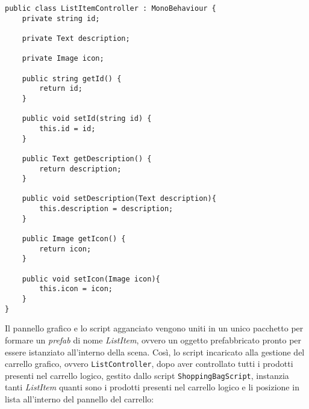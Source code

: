 \begin{lstlisting}[style=MyCStyle]
public class ListItemController : MonoBehaviour {
	private string id;

	private Text description;

	private Image icon;

	public string getId() {
		return id;
	}

	public void setId(string id) {
		this.id = id;
	}
	
	public Text getDescription() {
		return description;
	}
	
	public void setDescription(Text description){
		this.description = description;
	}
	
	public Image getIcon() {
		return icon;
	}
		
	public void setIcon(Image icon){
		this.icon = icon;
	}
}
\end{lstlisting}

Il pannello grafico e lo script agganciato vengono uniti in un unico pacchetto per formare un \textit{prefab} di nome \textit{ListItem}, ovvero un oggetto prefabbricato pronto per essere istanziato all'interno della scena. Così, lo script incaricato alla gestione del carrello grafico, ovvero \texttt{ListController}, dopo aver controllato tutti i prodotti presenti nel carrello logico, gestito dallo script \texttt{ShoppingBagScript}, instanzia tanti \textit{ListItem} quanti sono i prodotti presenti nel carrello logico e li posizione in lista all'interno del pannello del carrello:


